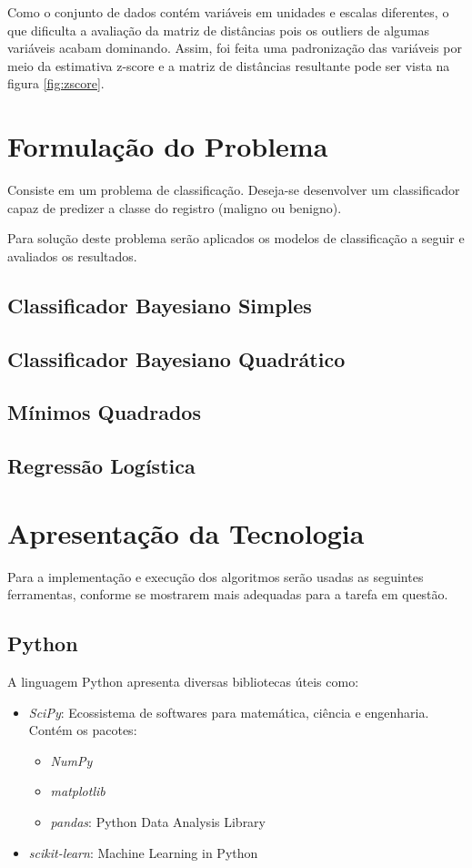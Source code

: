\documentclass[11pt,a4paper]{article}
\numberwithin{equation}{section}
\begin{document}
Como o conjunto de dados contém variáveis em unidades e escalas diferentes, o que dificulta a avaliação da matriz de distâncias pois os outliers de algumas variáveis acabam dominando. Assim, foi feita uma padronização das variáveis por meio da estimativa z-score e a matriz de distâncias resultante pode ser vista na figura \ref{fig:zscore}.

\section{Formulação do Problema}
Consiste em um problema de classificação. Deseja-se desenvolver um classificador capaz de predizer a classe do registro (maligno ou benigno).

Para solução deste problema serão aplicados os modelos de classificação a seguir e avaliados os resultados.
\subsection{Classificador Bayesiano Simples}
\subsection{Classificador Bayesiano Quadrático}
\subsection{Mínimos Quadrados}
\subsection{Regressão Logística}

\section{Apresentação da Tecnologia}
Para a implementação e execução dos algoritmos serão usadas as seguintes ferramentas, conforme se mostrarem mais adequadas para a tarefa em questão.

\subsection{Python}
A linguagem Python apresenta diversas bibliotecas úteis como:
\begin{itemize}
\item \textit{SciPy}: Ecossistema de softwares para matemática, ciência e engenharia. Contém os pacotes:
\begin{itemize}
\item \textit{NumPy}
\item \textit{matplotlib}
\item \textit{pandas}: Python Data Analysis Library
\end{itemize}
\item \textit{scikit-learn}: Machine Learning in Python
\end{itemize}
\end{document}

